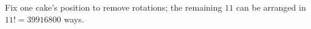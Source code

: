 Fix one cake's position to remove rotations; the remaining $11$ can be arranged in $11!=\boxed{39916800}$ ways.
